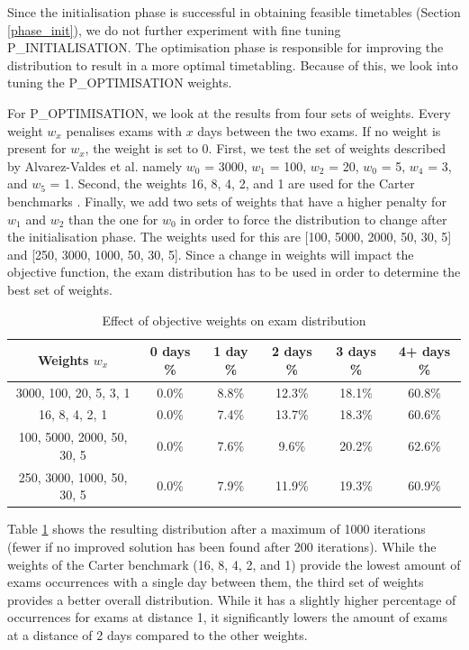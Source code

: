Since the initialisation phase is successful in obtaining feasible timetables (Section \ref{phase_init}), we do not further experiment with fine tuning P\_INITIALISATION. The optimisation phase is responsible for improving the distribution to result in a more optimal timetabling. Because of this, we look into tuning the P\_OPTIMISATION weights.

For P\_OPTIMISATION, we look at the results from four sets of weights. Every weight $w_x$ penalises exams with $x$ days between the two exams. If no weight is present for $w_x$, the weight is set to 0.  First, we test the set of weights described by Alvarez-Valdes et al. namely $w_0$ = 3000, $w_1$ = 100, $w_2$ = 20, $w_0$ = 5, $w_4$ = 3, and $w_5$ = 1. Second, the weights 16, 8, 4, 2, and 1 are used for the Carter benchmarks \cite{carter1996}. Finally, we add two sets of weights that have a higher penalty for $w_1$ and $w_2$ than the one for $w_0$ in order to force the distribution to change after the initialisation phase. The weights used for this are [100, 5000, 2000, 50, 30, 5] and [250, 3000, 1000, 50, 30, 5]. Since a change in weights will impact the objective function, the exam distribution has to be used in order to determine the best set of weights.

\begin{table}[h]
	\caption{Effect of objective weights on exam distribution}
	\label{tab:weights_distr}
	\centering
	\begin{tabular}{c c c c c c}
		\hline
  	\textbf{Weights $w_x$}	&
   \textbf{0 days \% } &
    \textbf{1 day \% } & 
    \textbf{2 days \% } &
    \textbf{3 days \% } & 
    \textbf{4+ days \%}\\ \hline
    3000, 100, 20, 5, 3, 1 & 0.0\% &  8.8\% & 12.3\% & 18.1\% & 60.8\% \\
    16, 8, 4, 2, 1 & 0.0\% & 7.4\% & 13.7\% & 18.3\% & 60.6\% \\
    100, 5000, 2000, 50, 30, 5 & 0.0\% & 7.6\% & 9.6\% & 20.2\% & 62.6\% \\
    250, 3000, 1000, 50, 30, 5 & 0.0\% &  7.9\% & 11.9\% & 19.3\% & 60.9\% \\
        \hline%
	\end{tabular}
\end{table}

Table \ref{tab:weights_distr} shows the resulting distribution after a maximum of 1000 iterations (fewer if no improved solution has been found after 200 iterations). While the weights of the Carter benchmark (16, 8, 4, 2, and 1) provide the lowest amount of exams occurrences with a single day between them, the third set of weights provides a better overall distribution. While it has a slightly higher percentage of occurrences for exams at distance 1, it significantly lowers the amount of exams at a distance of 2 days compared to the other weights.


